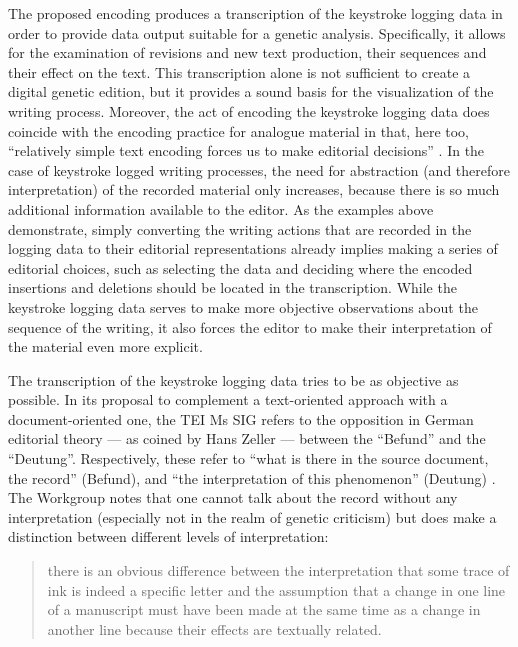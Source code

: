 \begin{paper}
The proposed encoding produces a transcription of the keystroke logging
data in order to provide data output suitable for a genetic analysis.
Specifically, it allows for the examination of revisions and new
text production, their sequences and their effect on the text. This transcription alone is not sufficient to create a digital genetic edition, but it provides a sound basis for the visualization of the writing process. Moreover, the act of encoding the keystroke logging data does coincide with the encoding practice for analogue material in that, here too, ``relatively simple
text encoding forces us to make editorial decisions'' \citep[112]{bleeker_future_2015}. In the case of keystroke logged writing processes, the need for
abstraction (and therefore interpretation) of the recorded material only
increases, because there is so much additional information available to the editor. As the examples above demonstrate, simply converting the writing actions that are recorded in the logging data
to their editorial representations already implies making a series of editorial choices, such as selecting the data and deciding where the encoded
insertions and deletions should be located in the transcription. While the keystroke logging data serves to
make more objective observations about the sequence of the writing, it
also forces the editor to make their interpretation of the material even
more explicit.

The transcription of the keystroke logging data tries to be as objective
as possible. In its proposal to complement a text-oriented approach with
a document-oriented one, the TEI Ms SIG refers to the opposition in
German editorial theory --- as coined by Hans Zeller --- between the
``Befund'' and the ``Deutung''. Respectively, these refer to ``what is there in the source
document, the record'' (Befund), and ``the interpretation of this phenomenon'' (Deutung)  \citep[§1.1]{the_tei_consortium_tei_2020}. The Workgroup notes that one
cannot talk about the record without any interpretation (especially not
in the realm of genetic criticism) but does make a distinction
between different levels of interpretation: 

\begin{quote}
there is an obvious
difference between the interpretation that some trace of ink is indeed a
specific letter and the assumption that a change in one line of a
manuscript must have been made at the same time as a change in another
line because their effects are textually related.
\begin{flushright}
\citep[§1.1]{the_tei_consortium_tei_2020}
\end{flushright}
\end{quote}


\end{paper}
